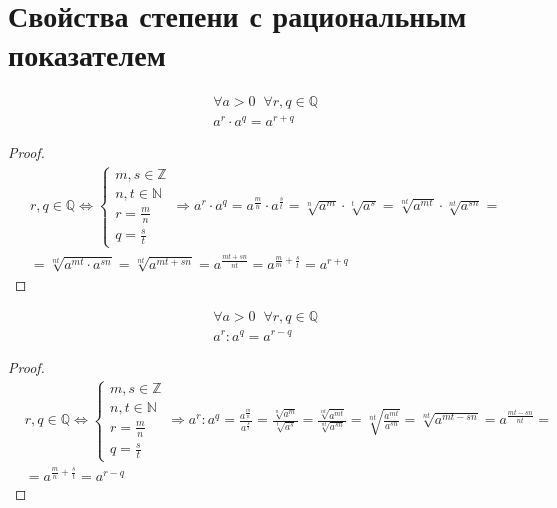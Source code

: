 \section{Свойства степени с рациональным показателем}

\begin{theorem}
    \begin{align*}
        &\forall a > 0 \;\; \forall r, q \in \mathbb{Q} \\
        &a^r \cdot a^q = a^{r + q}
    \end{align*}
\end{theorem}

\begin{proof}
    \begin{align*}
        &r, q \in \mathbb{Q} \iff
        \left\{\begin{array}{l}
            m,s \in \mathbb{Z} \\
            n,t \in \mathbb{N} \\
            r = \frac{m}{n} \\
            q = \frac{s}{t}
        \end{array}\right. \Rightarrow
        a^r \cdot a^q = a^\frac{m}{n} \cdot a^\frac{s}{t} = \sqrt[n]{a^m} \cdot \sqrt[t]{a^s} = \sqrt[nt]{a^{mt}} \cdot \sqrt[nt]{a^{sn}} = \\
        &= \sqrt[nt]{a^{mt} \cdot a^{sn}} = \sqrt[nt]{a^{mt + sn}}
        = a^\frac{mt + sn}{nt} = a^{\frac{m}{m} + \frac{s}{t}} = a^{r + q}
    \end{align*}
\end{proof}

\begin{theorem}
    \begin{align*}
        &\forall a > 0 \;\; \forall r, q \in \mathbb{Q} \\
        &a^r : a^q = a^{r - q}
    \end{align*}
\end{theorem}

\begin{proof}
    \begin{align*}
        &r, q \in \mathbb{Q} \iff
        \left\{\begin{array}{l}
            m,s \in \mathbb{Z} \\
            n,t \in \mathbb{N} \\
            r = \frac{m}{n} \\
            q = \frac{s}{t}
        \end{array}\right. \Rightarrow
        a^r : a^q = \frac{a^\frac{m}{n}}{a^\frac{s}{t}} = \frac{\sqrt[n]{a^m}}{\sqrt[t]{a^s}} = \frac{\sqrt[nt]{a^{mt}}}{\sqrt[nt]{a^{sn}}}
        = \sqrt[nt]{\frac{a^{mt}}{a^{sn}}} = \sqrt[nt]{a^{mt - sn}} = a^\frac{mt - sn}{nt} = \\
        &= a^{\frac{m}{n} + \frac{s}{t}} = a^{r - q}
    \end{align*}
\end{proof}